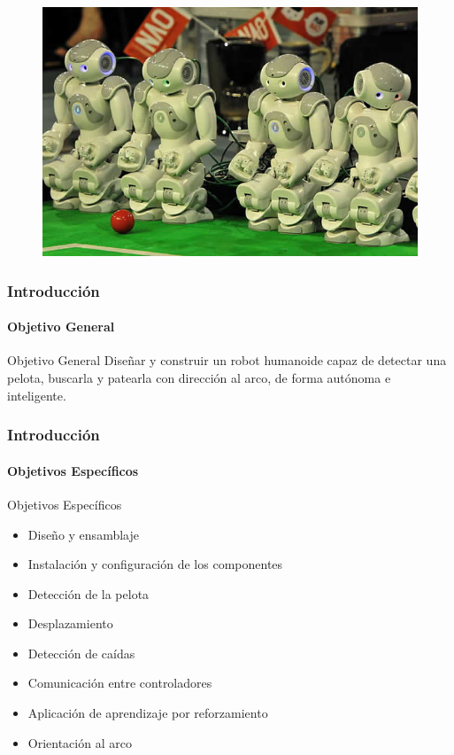 \documentclass{beamer}
\begin{document}
\begin{frame}
\begin{figure}
\includegraphics[scale=0.5]{13-06-28-robocup-eindhoven.jpg} 

\end{figure}
\end{frame}


\begin{frame}
  \frametitle{Introducci\'{o}n}
  \framesubtitle{Objetivo General}

  \begin{block}{Objetivo General}
	Dise\~nar y construir un robot humanoide capaz de detectar una pelota, buscarla y patearla con direcci\'on al arco, de forma aut\'onoma e inteligente.
   \end{block}
\end{frame}
\begin{frame}
  \frametitle{Introducci\'{o}n}
  \framesubtitle{Objetivos Espec\'{i}ficos}
  \begin{block}{Objetivos Espec\'{i}ficos}
  \begin{itemize}
    \item Dise\~no y ensamblaje
    \item Instalaci\'on y configuraci\'on de los componentes 
    \item Detecci\'on de la pelota
    \item Desplazamiento 
    \item Detecci\'on de ca\'idas
    \item Comunicaci\'on entre controladores
    \item Aplicaci\'on de aprendizaje por reforzamiento 
    \item Orientaci\'on al arco 
    \end{itemize}
  \end{block}
\end{frame}
\end{document}
